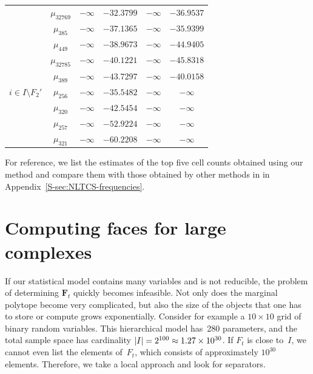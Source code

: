 \documentclass[aos,noinfoline]{imsart}
\newcommand{\face}{F}
\newcommand{\Fbf}{\mathbf{F}}
\theoremstyle{remark}
\theoremstyle{definition}
\begin{document}
\begin{table}[t]
\begin{tabular}{cccccc}
    \rowcolor{yellow} & $\mu_{32769}$ & $-\infty$ & $-32.3799$ &    $-\infty$ & $-36.9537$ \\  %
    \rowcolor{yellow} & $\mu_{385}$   & $-\infty$ & $-37.1365$ &   $-\infty$ & $-35.9399$  \\  %
    \rowcolor{yellow} & $\mu_{449}$   & $-\infty$ & $-38.9673$ &    $-\infty$ &  $-44.9405$ \\ %
    \rowcolor{yellow} & $\mu_{32785}$ & $-\infty$ & $-40.1221$ &     $-\infty$ & $-45.8318$ \\ %
    \rowcolor{yellow} & $\mu_{389}$   & $-\infty$ & $-43.7297$ &     $-\infty$ &  $-40.0158$ \\%
    \hline
    \rowcolor{cyan} $i\in I\setminus F_{2}'$ & $\mu_{256}$ &  $-\infty$ &  $-35.5482$    &  $-\infty$ &      $-\infty$ \\ %
    \rowcolor{cyan} & $\mu_{320}$ & $-\infty$ &  $-42.5454$    &  $-\infty$ &      $-\infty$ \\ %
    \rowcolor{cyan} & $\mu_{257}$ & $-\infty$ &  $-52.9224$    &  $-\infty$ &      $-\infty$ \\ %
    \rowcolor{cyan} & $\mu_{321}$ & $-\infty$ &  $-60.2208$   &  $-\infty$ &      $-\infty$ \\ %
    \hline
  \end{tabular}
  \label{table: mle}
\end{table}

For reference, we list the estimates of the top five cell counts obtained using our method and compare them with those
obtained by other methods in \citet{DobraLenkoski11:Copula_Gaussian_graphical_models} in
Appendix~\ref{S-sec:NLTCS-frequencies}.

\section{Computing faces for large complexes}
\label{sec:large-graphs}

If our statistical model contains many variables and is not reducible,
the problem of determining $\Fbf_{t}$ quickly becomes infeasible.  Not only does the marginal polytope become very
complicated, but also the size of the objects that one has to store or compute grows exponentially.
%
Consider for example a $10\times10$ grid of binary random variables.  This hierarchical model
has~280 parameters, %
and the total sample space has cardinality $|I|=2^{100}\approx\num{1.27E30}$.
If $\face_{t}$ is close to~$I$, we cannot even list the elements of~$\face_{t}$, which consists of approximately
$10^{30}$ elements.  Therefore, we take a local approach and look for separators.
\end{document}
